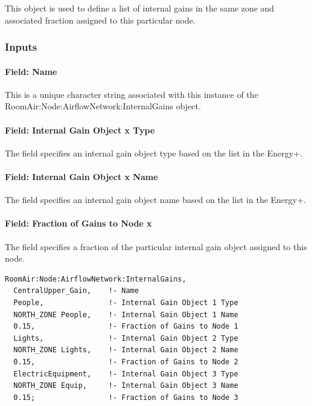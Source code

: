 This object is used to define a list of internal gains in the same zone and associated fraction assigned to this particular node.

\subsubsection{Inputs}\label{inputs-14-012}

\paragraph{Field: Name}\label{field-name-10-014}

This is a unique character string associated with this instance of the Room\-Air:\-Node:\-Air\-flow\-Net\-work:\-Internal\-Gains object.

\paragraph{Field: Internal Gain Object x Type}\label{field-internal-gain-object-x-type}

The field specifies an internal gain object type based on the list in the Energy+.

\paragraph{Field: Internal Gain Object x Name}\label{field-internal-gain-object-x-name}

The field specifies an internal gain object name based on the list in the Energy+.

\paragraph{Field: Fraction of Gains to Node x}\label{field-fraction-of-gains-to-node-x}

The field specifies a fraction of the particular internal gain object assigned to this node.

\begin{lstlisting}
RoomAir:Node:AirflowNetwork:InternalGains,
  CentralUpper_Gain,    !- Name
  People,               !- Internal Gain Object 1 Type
  NORTH_ZONE People,    !- Internal Gain Object 1 Name
  0.15,                 !- Fraction of Gains to Node 1
  Lights,               !- Internal Gain Object 2 Type
  NORTH_ZONE Lights,    !- Internal Gain Object 2 Name
  0.15,                 !- Fraction of Gains to Node 2
  ElectricEquipment,    !- Internal Gain Object 3 Type
  NORTH_ZONE Equip,     !- Internal Gain Object 3 Name
  0.15;                 !- Fraction of Gains to Node 3
\end{lstlisting}

